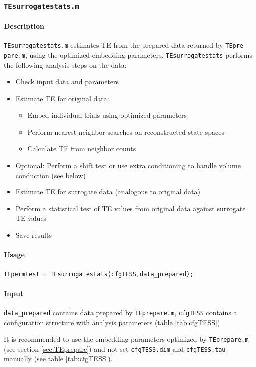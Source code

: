 \documentclass[a4paper,10pt]{article}
\begin{document}
\subsubsection{\texttt{TEsurrogatestats.m}} \label{sec:TEsurrogatestats}

\paragraph*{Description} \verb&TEsurrogatestats.m& estimates TE from the prepared data returned by \texttt{TEpre-\\pare.m}, using the optimized embedding parameters. \texttt{TEsurrogatestats} performs the following analysis steps on the data: 

\begin{itemize}
 \item Check input data and parameters
 \item Estimate TE for original data:
 \begin{itemize}
  \item Embed individual trials using optimized parameters
  \item Perform nearest neighbor searches on reconstructed state spaces
  \item Calculate TE from neighbor counts
 \end{itemize}
 \item Optional: Perform a shift test or use extra conditioning to handle volume conduction (see below)
 \item Estimate TE for surrogate data (analogous to original data)
 \item Perform a statistical test of TE values from original data against surrogate TE values
 \item Save results
\end{itemize}

\paragraph*{Usage} \verb&TEpermtest = TEsurrogatestats(cfgTESS,data_prepared);&

\paragraph*{Input} \texttt{data\_prepared} contains data prepared by \verb&TEprepare.m&, \verb&cfgTESS& contains a configuration structure with analysis parameters (table \ref{tab:cfgTESS}).

It is recommended to use the embedding parameters optimized by \texttt{TEprepare.m} (see section \ref{sec:TEprepare}) and not set \texttt{cfgTESS.dim} and \texttt{cfgTESS.tau} manually (see table \ref{tab:cfgTESS}). 
\end{document}
